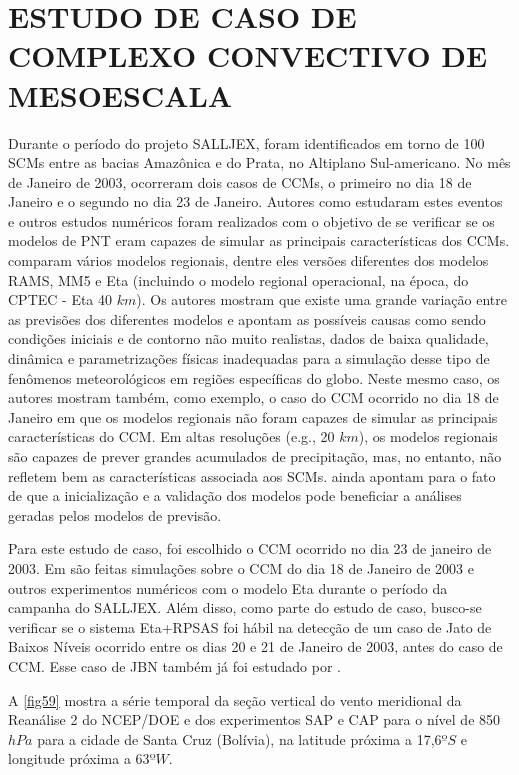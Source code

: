 \hypertarget{estilo:capitulo}{}
\chapter{ESTUDO DE CASO DE COMPLEXO CONVECTIVO DE MESOESCALA}
\label{ss:cap4}

Durante o período do projeto SALLJEX, foram identificados em torno de 100 SCMs entre as bacias Amazônica e do Prata, no Altiplano Sul-americano. No mês de Janeiro de 2003, ocorreram dois casos de CCMs, o primeiro no dia 18 de Janeiro e o segundo no dia 23 de Janeiro. Autores como  estudaram estes eventos e outros estudos numéricos foram realizados com o objetivo de se verificar se os modelos de PNT eram capazes de simular as principais características dos CCMs.  comparam vários modelos regionais, dentre eles versões diferentes dos modelos RAMS, MM5 e Eta (incluindo o modelo regional operacional, na época, do CPTEC - Eta 40 $km$). Os autores mostram que existe uma grande variação entre as previsões dos diferentes modelos e apontam as possíveis causas como sendo condições iniciais e de contorno não muito realistas, dados de baixa qualidade, dinâmica e parametrizações físicas inadequadas para a simulação desse tipo de fenômenos meteorológicos em regiões específicas do globo. Neste mesmo caso, os autores mostram também, como exemplo, o caso do CCM ocorrido no dia 18 de Janeiro em que os modelos regionais não foram capazes de simular as principais características do CCM. Em altas resoluções (e.g., 20 $km$), os modelos regionais são capazes de prever grandes acumulados de precipitação, mas, no entanto, não refletem bem as características associada aos SCMs.  ainda apontam para o fato de que a inicialização e a validação dos modelos pode beneficiar a análises geradas pelos modelos de previsão.

Para este estudo de caso, foi escolhido o CCM ocorrido no dia 23 de janeiro de 2003. Em  são feitas simulações sobre o CCM do dia 18 de Janeiro de 2003 e outros experimentos numéricos com o modelo Eta durante o período da campanha do SALLJEX. Além disso, como parte do estudo de caso, busco-se verificar se o sistema Eta+RPSAS foi hábil na detecção de um caso de Jato de Baixos Níveis ocorrido entre os dias 20 e 21 de Janeiro de 2003, antes do caso de CCM. Esse caso de JBN também já foi estudado por .

A \autoref{fig59} mostra a série temporal da seção vertical do vento meridional da Reanálise 2 do NCEP/DOE e dos experimentos SAP e CAP para o nível de 850 $hPa$ para a cidade de Santa Cruz (Bolívia), na latitude próxima a 17,6$ºS$ e longitude próxima a 63$ºW$.

